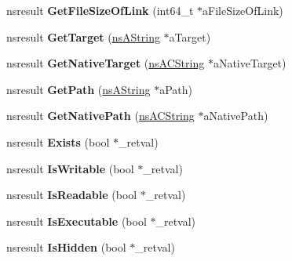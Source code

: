\begin{DoxyCompactItemize}
\item 
\mbox{\label{interfacens_i_file_a7a25d286a066b56307719f848adedac2}} 
nsresult {\bfseries Get\+File\+Size\+Of\+Link} (int64\+\_\+t $\ast$a\+File\+Size\+Of\+Link)
\item 
\mbox{\label{interfacens_i_file_a8a5879fa63494525fbced228e3c2d8e2}} 
nsresult {\bfseries Get\+Target} (\hyperlink{structns_string_container}{ns\+A\+String} $\ast$a\+Target)
\item 
\mbox{\label{interfacens_i_file_a71c164a86589e587a7810c8168834e5a}} 
nsresult {\bfseries Get\+Native\+Target} (\hyperlink{structns_c_string_container}{ns\+A\+C\+String} $\ast$a\+Native\+Target)
\item 
\mbox{\label{interfacens_i_file_a739a38bfd06cddd41bd1b29ca6b3d991}} 
nsresult {\bfseries Get\+Path} (\hyperlink{structns_string_container}{ns\+A\+String} $\ast$a\+Path)
\item 
\mbox{\label{interfacens_i_file_abe85089da8eb3f520168a1ad0e73931c}} 
nsresult {\bfseries Get\+Native\+Path} (\hyperlink{structns_c_string_container}{ns\+A\+C\+String} $\ast$a\+Native\+Path)
\item 
\mbox{\label{interfacens_i_file_af6c15e0d637e3988c4536d0221484b3b}} 
nsresult {\bfseries Exists} (bool $\ast$\+\_\+retval)
\item 
\mbox{\label{interfacens_i_file_a0d6faafbe2fc7af118f8b7fce988f0e0}} 
nsresult {\bfseries Is\+Writable} (bool $\ast$\+\_\+retval)
\item 
\mbox{\label{interfacens_i_file_a917fea5be97ff41ed830edc2d6802332}} 
nsresult {\bfseries Is\+Readable} (bool $\ast$\+\_\+retval)
\item 
\mbox{\label{interfacens_i_file_ab55fef556568621b26ab0004a8ac4a79}} 
nsresult {\bfseries Is\+Executable} (bool $\ast$\+\_\+retval)
\item 
\mbox{\label{interfacens_i_file_a149870d1b7778bb917af811e1b5a7364}} 
nsresult {\bfseries Is\+Hidden} (bool $\ast$\+\_\+retval)

\end{DoxyCompactItemize}
